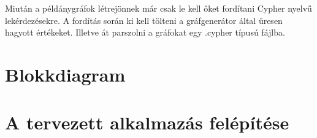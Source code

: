 Miután a példánygráfok létrejönnek már csak le kell őket fordítani Cypher nyelvű lekérdezésekre.
A fordítás során ki kell tölteni a gráfgenerátor által üresen hagyott értékeket. Illetve át parszolni a
gráfokat egy .cypher típusú fájlba.  
  

\section{Blokkdiagram}

\section{A tervezett alkalmazás felépítése}
